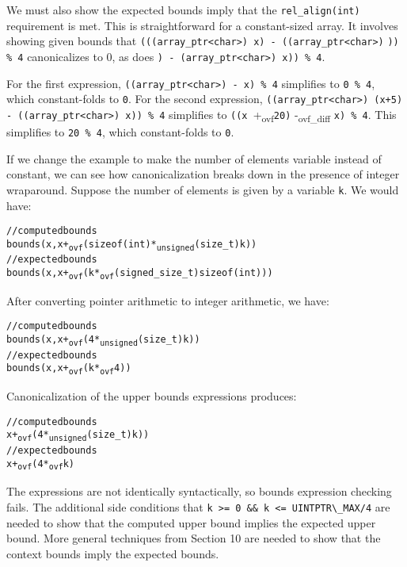 We must also show the expected bounds imply that the 
\verb|rel_align(int)| requirement is met. This is straightforward for
a constant-sized array. It involves showing given bounds{}{}
that \verb|(((array_ptr<char>) x) - ((array_ptr<char>)| \verb|)) % 4| canonicalizes to 0, as does
\arrayptrchar {}\verb|) - (array_ptr<char>) x)) % 4|.

For the first expression, \verb|((array_ptr<char>) - x) % 4|
simplifies to \verb|0 % 4|, which constant-folds to \verb|0|. 
For the second expression, \verb|((array_ptr<char>) (x+5) - ((array_ptr<char>) x)) % 4|
simplifies to \verb|((x |+\textsubscript{ovf}\verb|20)| -\textsubscript{ovf\_diff} \verb|x) % 4|. This
simplifies to \verb|20 % 4|, which constant-folds to \verb|0|.


If we change the example to make the number of elements variable instead
of constant, we can see how canonicalization breaks down in the presence
of integer wraparound. Suppose the number of elements is given by a
variable \verb|k|. We would have:

\begin{alltt}
// computed bounds
bounds(x, x +\textsubscript{ovf} (sizeof(int) *\textsubscript{unsigned} (size\_t) k))
// expected bounds
bounds(x, x +\textsubscript{ovf} (k *\textsubscript{ovf} (signed\_size\_t) sizeof(int)))
\end{alltt}

After converting pointer arithmetic to integer arithmetic, we have:
\begin{alltt}
// computed bounds
bounds(x, x +\textsubscript{ovf} (4 *\textsubscript{unsigned} (size\_t) k))
// expected bounds
bounds(x, x +\textsubscript{ovf} (k *\textsubscript{ovf} 4))
\end{alltt}

Canonicalization of the upper bounds expressions produces:
\begin{alltt}
// computed bounds
x +\textsubscript{ovf} (4 *\textsubscript{unsigned} (size\_t) k))
// expected bounds
x +\textsubscript{ovf} (4 *\textsubscript{ovf} k)
\end{alltt}

The expressions are not identically syntactically, so bounds expression
checking fails. The additional side conditions that \verb|k >= 0 && k <= UINTPTR\_MAX/4|
are needed to show that the computed upper bound implies the expected upper bound. More
general techniques from Section 10 are needed to show that the context
bounds imply the expected bounds.

